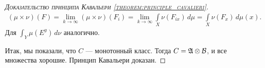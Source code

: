 \begin{proof}[\normalfont\textsc{Доказательство принципа Кавальери \ref{theorem:principle_cavalieri}}]
 \begin{align*}
  (\mu \times \nu)(F)  = \lim_{k \to \infty} (\mu \times \nu)(F_i) = \lim_{k \to \infty} \int\limits_{X} \nu(F_{ix}) \, d\mu = \int\limits_{X} \nu(F_x) \, d\mu(x)
 .\end{align*} Для $\int_{Y} \mu(E^{y}) \, d\nu  $ аналогично.

 Итак, мы показали, что $C$ --- монотонный класс. Тогда $C = \mathfrak{A} \otimes \mathcal{B}$, и все множества хорошие. Принцип Кавальери доказан.
\end{proof}


